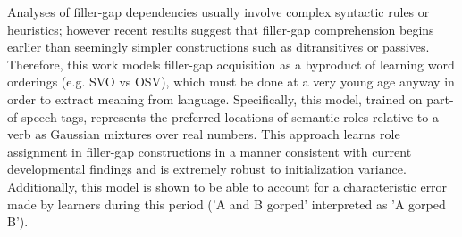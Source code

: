 Analyses of filler-gap dependencies usually involve complex syntactic rules or heuristics; however recent results suggest that filler-gap comprehension begins earlier than seemingly simpler constructions such as ditransitives or passives. Therefore, this work models filler-gap acquisition as a byproduct of learning word orderings (e.g. SVO vs OSV), which must be done at a very young age anyway in order to extract meaning from language. Specifically, this model, trained on part-of-speech tags, represents the preferred locations of semantic roles relative to a verb as Gaussian mixtures over real numbers. This approach learns role assignment in filler-gap constructions in a manner consistent with current developmental findings and is extremely robust to initialization variance. Additionally, this model is shown to be able to account for a characteristic error made by learners during this period ('A and B gorped' interpreted as 'A gorped B').

